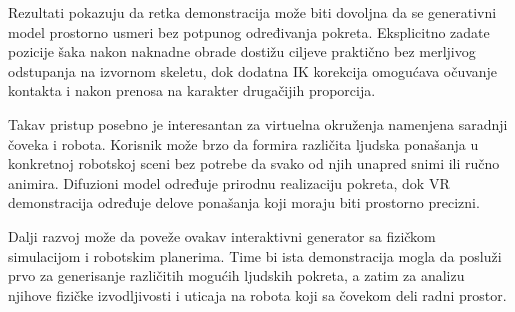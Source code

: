 \documentclass{article}
\begin{document}
Rezultati pokazuju da retka demonstracija može biti dovoljna da se generativni model prostorno usmeri bez potpunog određivanja pokreta. Eksplicitno zadate pozicije šaka nakon naknadne obrade dostižu ciljeve praktično bez merljivog odstupanja na izvornom skeletu, dok dodatna IK korekcija omogućava očuvanje kontakta i nakon prenosa na karakter drugačijih proporcija.

Takav pristup posebno je interesantan za virtuelna okruženja namenjena saradnji čoveka i robota. Korisnik može brzo da formira različita ljudska ponašanja u konkretnoj robotskoj sceni bez potrebe da svako od njih unapred snimi ili ručno animira. Difuzioni model određuje prirodnu realizaciju pokreta, dok VR demonstracija određuje delove ponašanja koji moraju biti prostorno precizni.

Dalji razvoj može da poveže ovakav interaktivni generator sa fizičkom simulacijom i robotskim planerima. Time bi ista demonstracija mogla da posluži prvo za generisanje različitih mogućih ljudskih pokreta, a zatim za analizu njihove fizičke izvodljivosti i uticaja na robota koji sa čovekom deli radni prostor.



\end{document}
